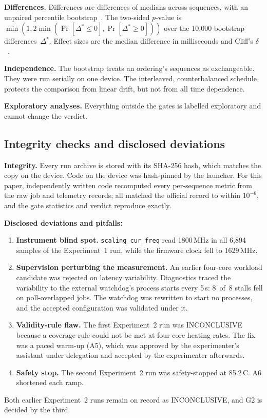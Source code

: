 \documentclass[conference,a4paper]{IEEEtran}
\newcommand{\degC}{\,\textdegree{}C}
\newcommand{\code}[1]{\texttt{#1}}
\begin{document}
\textbf{Differences.} Differences are differences of medians across sequences, with an unpaired percentile
bootstrap~\cite{efron1979}. The two-sided $p$-value is
$\min(1, 2\min(\Pr[\Delta^*\le 0], \Pr[\Delta^*\ge0]))$ over the 10{,}000 bootstrap differences~$\Delta^*$.
Effect sizes are the median difference in milliseconds and Cliff's $\delta$~\cite{cliff1993}.

\textbf{Independence.} The bootstrap treats an ordering's sequences as exchangeable. They were run serially on one
device. The interleaved, counterbalanced schedule protects the comparison from linear drift, but not from all time
dependence.

\textbf{Exploratory analyses.} Everything outside the gates is labelled exploratory and cannot change the verdict.

\subsection{Integrity checks and disclosed deviations}\label{sec:integrity}
\textbf{Integrity.} Every run archive is stored with its SHA-256 hash, which matches the copy on the device. Code on
the device was hash-pinned by the launcher. For this paper, independently written code recomputed every
per-sequence metric from the raw job and telemetry records; all matched the official record to within $10^{-6}$,
and the gate statistics and verdict reproduce exactly.

\textbf{Disclosed deviations and pitfalls:}
\begin{enumerate}
\item \textbf{Instrument blind spot.} \code{scaling\_cur\_freq} read 1800\,MHz in all 6{,}894 samples of the
Experiment~1 run, while the firmware clock fell to 1629\,MHz.
\item \textbf{Supervision perturbing the measurement.} An earlier four-core workload candidate was rejected on
latency variability. Diagnostics traced the variability to the external watchdog's process starts every 5\,s:
8~of~8 stalls fell on poll-overlapped jobs. The watchdog was rewritten to start no processes, and the accepted
configuration was validated under it.
\item \textbf{Validity-rule flaw.} The first Experiment~2 run was INCONCLUSIVE because a coverage rule could not be
met at four-core heating rates. The fix was a paced warm-up (A5), which was approved by the experimenter's
assistant under delegation and accepted by the experimenter afterwards.
\item \textbf{Safety stop.} The second Experiment~2 run was safety-stopped at 85.2\degC{}. A6 shortened each ramp.
\end{enumerate}
Both earlier Experiment~2 runs remain on record as INCONCLUSIVE, and G2 is decided by the third.
\end{document}
